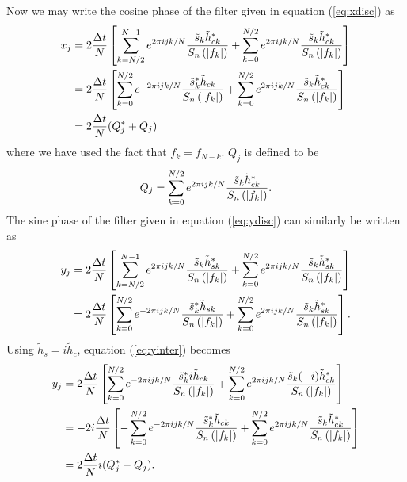 Now we may write the cosine phase of the filter given in equation
(\ref{eq:xdisc}) as
\begin{equation}
\begin{split}
x_j &= 
2\frac{\Delta t}{N}
\left[
  \sum_{k=N/2}^{N-1} e^{2\pi ijk/N} 
  \frac{\tilde{s}_k \tilde{h}_{ck}^\ast}{S_n\left(\left|f_{k}\right|\right)}
  +
  \sum_{k=0}^{N/2} e^{2\pi ijk/N} 
  \frac{\tilde{s}_k \tilde{h}_{ck}^\ast}{S_n\left(\left|f_{k}\right|\right)}
\right] \\
&= 2\frac{\Delta t}{N}
\left[
  \sum_{k=0}^{N/2} e^{-2\pi ijk/N} 
  \frac{\tilde{s}_k^\ast \tilde{h}_{ck}}{S_n\left(\left|f_{k}\right|\right)}
  +
  \sum_{k=0}^{N/2} e^{2\pi ijk/N} 
  \frac{\tilde{s}_k \tilde{h}_{ck}^\ast}{S_n\left(\left|f_{k}\right|\right)}
\right] \\
&= 2\frac{\Delta t}{N}(Q_j^\ast + Q_j)
\end{split}
\end{equation}
where we have used the fact that $f_k = f_{N-k}$. $Q_j$ is defined to be
\begin{equation}
\label{eq:Qdef}
Q_j = \sum_{k=0}^{N/2} e^{2\pi ijk/N} 
  \frac{\tilde{s}_k \tilde{h}_{ck}^\ast}{S_n\left(\left|f_{k}\right|\right)}.
\end{equation}
The sine phase of the filter given in equation (\ref{eq:ydisc}) can similarly
be written as
\begin{equation}
\begin{split}
\label{eq:yinter}
y_j &=
2\frac{\Delta t}{N}
\left[
  \sum_{k=N/2}^{N-1} e^{2\pi ijk/N} 
  \frac{\tilde{s}_k \tilde{h}_{sk}^\ast}{S_n\left(\left|f_{k}\right|\right)}
  +
  \sum_{k=0}^{N/2} e^{2\pi ijk/N} 
  \frac{\tilde{s}_k \tilde{h}_{sk}^\ast}{S_n\left(\left|f_{k}\right|\right)}
\right] \\
&= 
2\frac{\Delta t}{N}
\left[
  \sum_{k=0}^{N/2} e^{-2\pi ijk/N} 
  \frac{\tilde{s}_k^\ast \tilde{h}_{sk}}{S_n\left(\left|f_{k}\right|\right)}
  +
  \sum_{k=0}^{N/2} e^{2\pi ijk/N} 
  \frac{\tilde{s}_k \tilde{h}_{sk}^\ast}{S_n\left(\left|f_{k}\right|\right)}
\right].
\end{split}
\end{equation}
Using $\tilde{h}_s = i \tilde{h}_c$, equation (\ref{eq:yinter}) becomes
\begin{equation}
\begin{split}
y_j &= 
2\frac{\Delta t}{N}
\left[
  \sum_{k=0}^{N/2} e^{-2\pi ijk/N} 
  \frac{\tilde{s}_k^\ast i\tilde{h}_{ck}}{S_n\left(\left|f_{k}\right|\right)}
  +
  \sum_{k=0}^{N/2} e^{2\pi ijk/N} 
  \frac{\tilde{s}_k (-i)\tilde{h}_{ck}^\ast}{S_n\left(\left|f_{k}\right|\right)}
\right] \\
& = 
-2i\frac{\Delta t}{N}
\left[
  - \sum_{k=0}^{N/2} e^{-2\pi ijk/N} 
  \frac{\tilde{s}_k^\ast \tilde{h}_{ck}}{S_n\left(\left|f_{k}\right|\right)}
  +
  \sum_{k=0}^{N/2} e^{2\pi ijk/N} 
  \frac{\tilde{s}_k \tilde{h}_{ck}^\ast}{S_n\left(\left|f_{k}\right|\right)}
\right] \\
& = 
2\frac{\Delta t}{N}i(Q_j^\ast - Q_j).
\end{split}
\end{equation}
